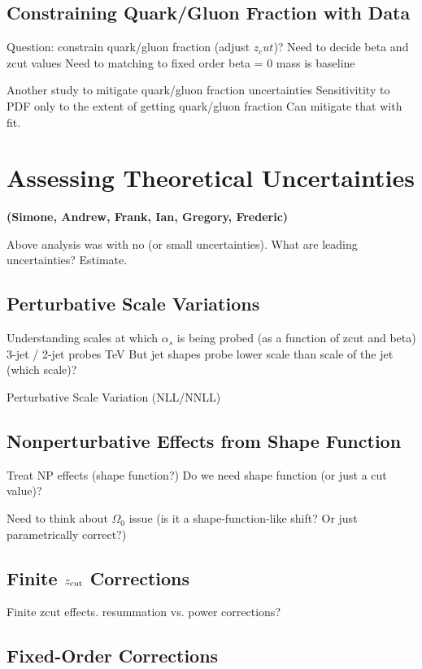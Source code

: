 \documentclass[11pt,letterpaper]{article}
\newcommand{\info}[1]{\textbf{\textcolor{mildred}{(#1)}}}
\begin{document}
\subsection{Constraining Quark/Gluon Fraction with Data}

	Question:  constrain quark/gluon fraction (adjust $z_cut$)?
	Need to decide beta and zcut values
	Need to matching to fixed order
	beta = 0 mass is baseline
	
	
	Another study to mitigate quark/gluon fraction uncertainties
	Sensitivitity to PDF only to the extent of getting quark/gluon fraction
	Can mitigate that with fit.

\section{Assessing Theoretical Uncertainties}

\info{Simone, Andrew, Frank, Ian, Gregory, Frederic}

Above analysis was with no (or small uncertainties).  What are leading uncertainties?  Estimate.

\subsection{Perturbative Scale Variations}

	Understanding scales at which $\alpha_s$ is being probed (as a function of zcut and beta)
		3-jet / 2-jet probes TeV
		But jet shapes probe lower scale than scale of the jet (which scale)?

	Perturbative Scale Variation (NLL/NNLL)


\subsection{Nonperturbative Effects from Shape Function}

	Treat NP effects (shape function?)  	Do we need shape function (or just a cut value)?

	Need to think about $\Omega_0$ issue (is it a shape-function-like shift?  Or just parametrically correct?)


\subsection{Finite $z_{\rm cut}$ Corrections}

	Finite zcut effects.  resummation vs.  power corrections?

\subsection{Fixed-Order Corrections}
\end{document}
